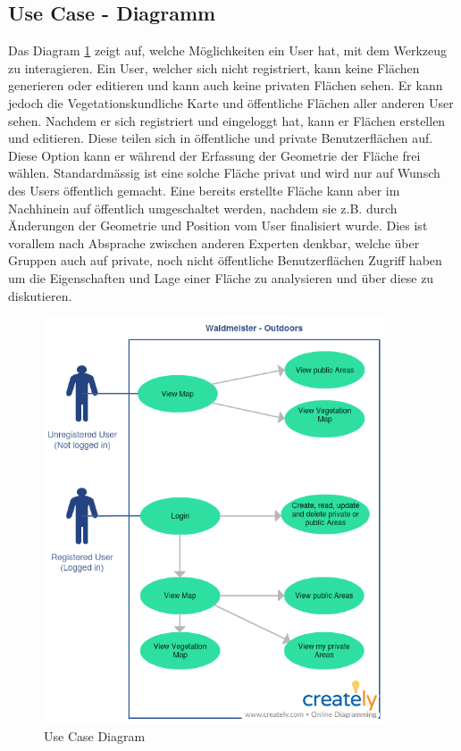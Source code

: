 \subsection{Use Case - Diagramm}
Das Diagram \ref{fig:uc1} zeigt auf, welche M\"oglichkeiten ein User hat, mit dem Werkzeug zu interagieren. Ein User, welcher sich nicht registriert, kann keine Fl\"achen generieren oder editieren und kann auch keine privaten Fl\"achen sehen. Er kann jedoch die Vegetationskundliche Karte und \"offentliche Fl\"achen aller anderen User sehen. Nachdem er sich registriert und eingeloggt hat, kann er Fl\"achen erstellen und editieren. Diese teilen sich in \"offentliche und private Benutzerfl\"achen auf. Diese Option kann er w\"ahrend der Erfassung der Geometrie der Fl\"ache frei w\"ahlen. Standardm\"assig ist eine solche Fl\"ache privat und wird nur auf Wunsch des Users \"offentlich gemacht. Eine bereits erstellte Fl\"ache kann aber im Nachhinein auf \"offentlich umgeschaltet werden, nachdem sie z.B. durch \"Anderungen der Geometrie und Position vom User finalisiert wurde. Dies ist vorallem nach Absprache zwischen anderen Experten denkbar, welche \"uber Gruppen auch auf private, noch nicht \"offentliche Benutzerfl\"achen Zugriff haben um die Eigenschaften und Lage einer Fl\"ache zu analysieren und \"uber diese zu diskutieren.
\begin{figure}[h]
\centering
    \includegraphics[width=0.9\textwidth]{WaldmeisterMap_USECASE}
    \caption{Use Case Diagram}
    \label{fig:uc1}
\end{figure}

